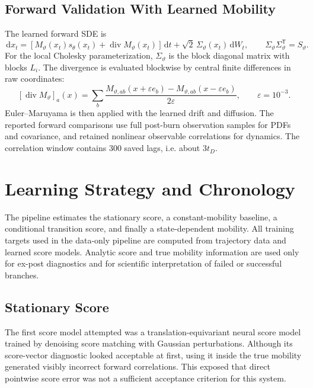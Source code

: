 \documentclass[11pt]{article}
\newcommand{\dd}{\,\mathrm{d}}
\newcommand{\T}{\mathsf{T}}
\begin{document}
\subsection{Forward Validation With Learned Mobility}

The learned forward SDE is
\[
  \dd x_t=
  \left[
    M_\vartheta(x_t)s_\theta(x_t)
    +
    \operatorname{div}M_\vartheta(x_t)
  \right]\dd t
  +
  \sqrt2\,\Sigma_\vartheta(x_t)\dd W_t,
  \qquad
  \Sigma_\vartheta\Sigma_\vartheta^\T=S_\vartheta .
\]
For the local Cholesky parameterization, $\Sigma_\vartheta$ is the block
diagonal matrix with blocks $L_i$.  The divergence is evaluated blockwise by
central finite differences in raw coordinates:
\[
  [\operatorname{div}M_\vartheta]_a(x)
  =
  \sum_b
  \frac{
    M_{\vartheta,ab}(x+\varepsilon e_b)
    -
    M_{\vartheta,ab}(x-\varepsilon e_b)
  }{2\varepsilon},
  \qquad
  \varepsilon=10^{-3}.
\]
Euler--Maruyama is then applied with the learned drift and diffusion.  The
reported forward comparisons use full post-burn observation samples for PDFs
and covariance, and retained nonlinear observable correlations for dynamics.
The correlation window contains $300$ saved lags, i.e. about $3t_D$.

\section{Learning Strategy and Chronology}

The pipeline estimates the stationary score, a constant-mobility baseline, a
conditional transition score, and finally a state-dependent mobility.  All
training targets used in the data-only pipeline are computed from trajectory
data and learned score models.  Analytic score and true mobility information are
used only for ex-post diagnostics and for scientific interpretation of failed or
successful branches.

\subsection{Stationary Score}

The first score model attempted was a translation-equivariant neural score model
trained by denoising score matching with Gaussian perturbations.  Although its
score-vector diagnostic looked acceptable at first, using it inside the true
mobility generated visibly incorrect forward correlations.  This exposed that
direct pointwise score error was not a sufficient acceptance criterion for this
system.
\end{document}
